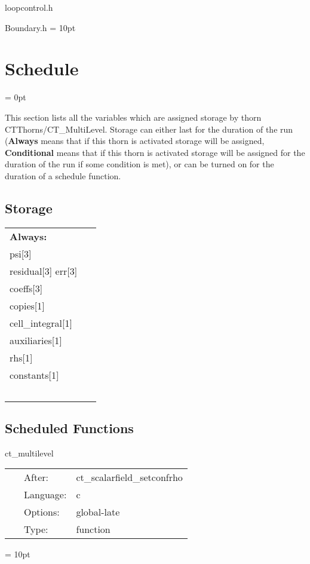 loopcontrol.h

Boundary.h
\vspace{2mm}\parskip = 10pt 

\section{Schedule} 


\parskip = 0pt


\noindent This section lists all the variables which are assigned storage by thorn CTThorns/CT\_MultiLevel.  Storage can either last for the duration of the run ({\bf Always} means that if this thorn is activated storage will be assigned, {\bf Conditional} means that if this thorn is activated storage will be assigned for the duration of the run if some condition is met), or can be turned on for the duration of a schedule function.


\subsection*{Storage}

\hspace{5mm}

 \begin{tabular*}{160mm}{ll} 

{\bf Always:}&  ~ \\ 
 psi[3] & ~\\ 
 residual[3] err[3] & ~\\ 
 coeffs[3] & ~\\ 
 copies[1] & ~\\ 
 cell\_integral[1] & ~\\ 
 auxiliaries[1] & ~\\ 
 rhs[1] & ~\\ 
 constants[1] & ~\\ 
~ & ~\\ 
\end{tabular*} 


\subsection*{Scheduled Functions}
\vspace{5mm}


\hspace{5mm} ct\_multilevel 

\hspace{5mm}{\it main multilevel function } 


\hspace{5mm}

 \begin{tabular*}{160mm}{cll} 
~ & After:  & ct\_scalarfield\_setconfrho \\ 
~ & Language:  & c \\ 
~ & Options:  & global-late \\ 
~ & Type:  & function \\ 
\end{tabular*} 



\vspace{5mm}\parskip = 10pt 

